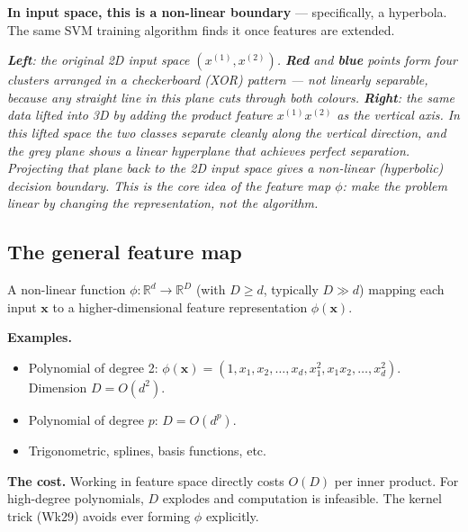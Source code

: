 \documentclass[11pt, a4paper]{article}
\begin{document}
\textbf{In input space, this is a non-linear boundary} — specifically, a hyperbola. The same SVM training algorithm finds it once features are extended.

\begin{center}

\footnotesize\textit{\textbf{Left}: the original 2D input space $(x^{(1)}, x^{(2)})$. \textbf{Red} and \textbf{blue} points form four clusters arranged in a checkerboard (XOR) pattern --- not linearly separable, because any straight line in this plane cuts through both colours. \textbf{Right}: the same data lifted into 3D by adding the product feature $x^{(1)} x^{(2)}$ as the vertical axis. In this lifted space the two classes separate cleanly along the vertical direction, and the grey plane shows a linear hyperplane that achieves perfect separation. Projecting that plane back to the 2D input space gives a non-linear (hyperbolic) decision boundary. This is the core idea of the feature map $\phi$: make the problem linear by changing the representation, not the algorithm.}
\end{center}

\subsection{The general feature map}

\begin{defbox}
A non-linear function $\phi : \mathbb{R}^d \to \mathbb{R}^D$ (with $D \ge d$, typically $D \gg d$) mapping each input $\mathbf{x}$ to a higher-dimensional feature representation $\phi(\mathbf{x})$.
\end{defbox}

\textbf{Examples.}
\begin{itemize}
  \item Polynomial of degree 2: $\phi(\mathbf{x}) = (1, x_1, x_2, \ldots, x_d, x_1^2, x_1 x_2, \ldots, x_d^2)$. Dimension $D = O(d^2)$.
  \item Polynomial of degree $p$: $D = O(d^p)$.
  \item Trigonometric, splines, basis functions, etc.
\end{itemize}

\textbf{The cost.} Working in feature space directly costs $O(D)$ per inner product. For high-degree polynomials, $D$ explodes and computation is infeasible. The kernel trick (Wk29) avoids ever forming $\phi$ explicitly.

\end{document}
